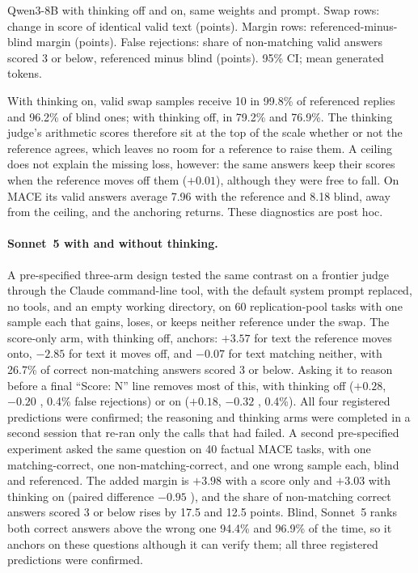 \begin{table}[htbp]
\centering
\caption{Qwen3-8B with thinking off and on, same weights and prompt. Swap rows: change in score of identical valid text (points). Margin rows: referenced-minus-blind margin (points). False rejections: share of non-matching valid answers scored 3 or below, referenced minus blind (points). 95\% CI; mean generated tokens.\pre}
\label{tab:toggle}
\footnotesize
\setlength{\tabcolsep}{3pt}
\begin{adjustbox}{max width=\linewidth}\end{adjustbox}

\end{table}

With thinking on, valid swap samples receive 10 in 99.8\% of referenced replies and 96.2\% of blind ones; with thinking off, in 79.2\% and 76.9\%. The thinking judge's arithmetic scores therefore sit at the top of the scale whether or not the reference agrees, which leaves no room for a reference to raise them. A ceiling does not explain the missing loss, however: the same answers keep their scores when the reference moves off them ($+0.01$), although they were free to fall. On \textsc{MACE} its valid answers average 7.96 with the reference and 8.18 blind, away from the ceiling, and the anchoring returns. These diagnostics are post hoc.

\paragraph{Sonnet~5 with and without thinking.}
A pre-specified three-arm design tested the same contrast on a frontier judge through the Claude command-line tool, with the default system prompt replaced, no tools, and an empty working directory, on 60 replication-pool tasks with one sample each that gains, loses, or keeps neither reference under the swap. The score-only arm, with thinking off, anchors: $+3.57$  for text the reference moves onto, $-2.85$  for text it moves off, and $-0.07$  for text matching neither, with 26.7\%  of correct non-matching answers scored 3 or below. Asking it to reason before a final ``Score: N'' line removes most of this, with thinking off ($+0.28$, $-0.20$ , 0.4\% false rejections) or on ($+0.18$, $-0.32$ , 0.4\%). All four registered predictions were confirmed; the reasoning and thinking arms were completed in a second session that re-ran only the calls that had failed.\pre{}
A second pre-specified experiment asked the same question on 40 factual \textsc{MACE} tasks, with one matching-correct, one non-matching-correct, and one wrong sample each, blind and referenced. The added margin is $+3.98$  with a score only and $+3.03$  with thinking on (paired difference $-0.95$ ), and the share of non-matching correct answers scored 3 or below rises by 17.5 and 12.5 points. Blind, Sonnet~5 ranks both correct answers above the wrong one 94.4\% and 96.9\% of the time, so it anchors on these questions although it can verify them; all three registered predictions were confirmed.\pre

